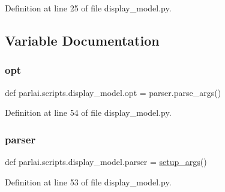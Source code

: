 Definition at line 25 of file display\+\_\+model.\+py.



\subsection{Variable Documentation}
\mbox{\label{namespaceparlai_1_1scripts_1_1display__model_a53054dd9ddcd16817b6dde616a4236c5}} 
\subsubsection{\texorpdfstring{opt}{opt}}
{\footnotesize\ttfamily def parlai.\+scripts.\+display\+\_\+model.\+opt = parser.\+parse\+\_\+args()}



Definition at line 54 of file display\+\_\+model.\+py.

\mbox{\label{namespaceparlai_1_1scripts_1_1display__model_a34f269d469b91fcaf21a045c6f4a3598}} 
\subsubsection{\texorpdfstring{parser}{parser}}
{\footnotesize\ttfamily def parlai.\+scripts.\+display\+\_\+model.\+parser = \hyperlink{namespaceparlai_1_1scripts_1_1display__model_a9141f8dde0f690b4d641fe08c193e2b5}{setup\+\_\+args}()}



Definition at line 53 of file display\+\_\+model.\+py.

